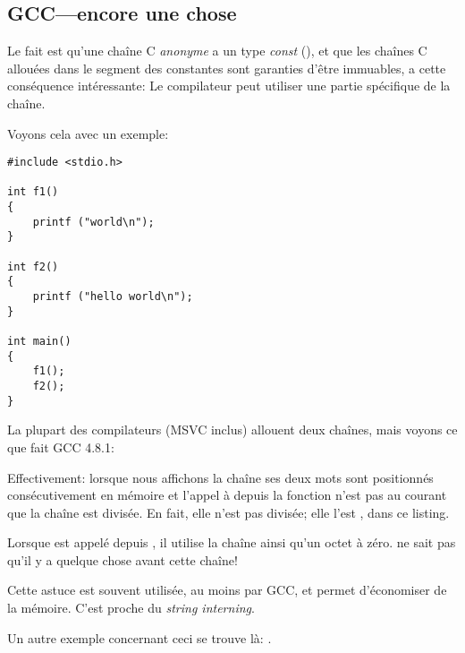 ﻿%
\subsection{GCC---encore une chose}
\label{use_parts_of_C_strings}

Le fait est qu'une chaîne C \emph{anonyme} a un type \emph{const} (),
et que les chaînes C allouées dans le segment des constantes sont garanties d'être immuables,
a cette conséquence intéressante:
Le compilateur peut utiliser une partie spécifique de la chaîne.

Voyons cela avec un exemple:

\begin{lstlisting}[style=customc]
#include <stdio.h>

int f1()
{
	printf ("world\n");
}

int f2()
{
	printf ("hello world\n");
}

int main()
{
	f1();
	f2();
}
\end{lstlisting}

La plupart des compilateurs \CCpp{} (MSVC inclus) allouent deux chaînes, mais voyons ce que fait GCC 4.8.1:



Effectivement: lorsque nous affichons la chaîne  ses deux mots sont positionnés
consécutivement en mémoire et l'appel à \puts depuis la fonction 
n'est pas au courant que la chaîne est divisée.
En fait, elle n'est pas divisée; elle l'est , dans ce listing.

Lorsque \puts est appelé depuis , il utilise la chaîne  ainsi qu'un
octet à zéro. \puts ne sait pas qu'il y a quelque chose avant cette chaîne!

Cette astuce est souvent utilisée, au moins par GCC, et permet d'économiser de la mémoire.
C'est proche du \emph{string interning}. %

Un autre exemple concernant ceci se trouve là: .

